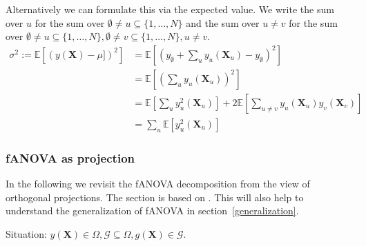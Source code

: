 Alternatively we can formulate this via the expected value. We write the sum over $u$ for the sum over $\emptyset \neq u \subseteq \{1, \dots, N\}$ and the sum over $u \neq v$ for the sum over $\emptyset \neq u \subseteq \{1, \dots, N\}, \emptyset \neq v \subseteq \{1, \dots, N\}, u \neq v$.
\begin{align*}
    \sigma^2 := \mathbb{E}[(y(\boldsymbol{X}) - \mu])^2]
    &= \mathbb{E}[(y_{\emptyset} + \sum_{u} y_u({\boldsymbol{X}_u}) - y_{\emptyset})^2] \\
    &= \mathbb{E}[(\sum_{u} y_u({\boldsymbol{X}_u}))^2] \\
    &= \mathbb{E}[\sum_{u} y_u^2({\boldsymbol{X}_u})] + 2 \mathbb{E}[\sum_{u \neq v} y_u({\boldsymbol{X}_u})  y_v({\boldsymbol{X}_v})] \\
    & = \sum_{u} \mathbb{E}[y_u^2({\boldsymbol{X}_u})]
\end{align*}




\subsubsection*{fANOVA as projection}
In the following we revisit the fANOVA decomposition from the view of orthogonal projections. The section is based on \cite{Vaart_1998}.
This will also help to understand the generalization of fANOVA in section~\ref{generalization}.\par

Situation: $y(\boldsymbol{X}) \in \Omega, \mathcal{G} \subseteq \Omega, g(\boldsymbol{X}) \in \mathcal{G}$.\par

